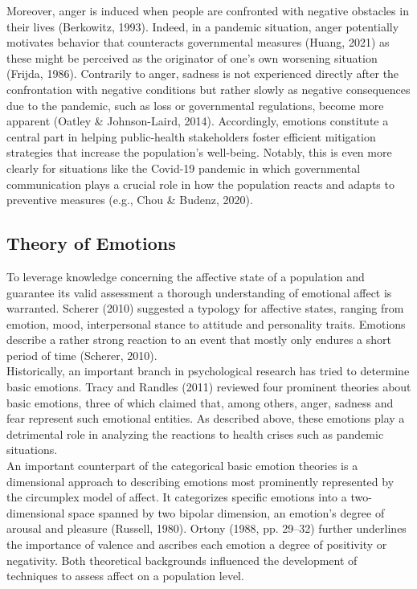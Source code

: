\documentclass[
  english,
  jou,floatsintext]{apa7}
\begin{document}
Moreover, anger is induced when people are confronted with negative obstacles in their lives (Berkowitz, 1993). Indeed, in a pandemic situation, anger potentially motivates behavior that counteracts governmental measures (Huang, 2021) as these might be perceived as the originator of one's own worsening situation (Frijda, 1986). Contrarily to anger, sadness is not experienced directly after the confrontation with negative conditions but rather slowly as negative consequences due to the pandemic, such as loss or governmental regulations, become more apparent (Oatley \& Johnson-Laird, 2014).
Accordingly, emotions constitute a central part in helping public-health stakeholders foster efficient mitigation strategies that increase the population's well-being. Notably, this is even more clearly for situations like the Covid-19 pandemic in which governmental communication plays a crucial role in how the population reacts and adapts to preventive measures (e.g., Chou \& Budenz, 2020).

\hypertarget{theory-of-emotions}{%
\subsection{Theory of Emotions}\label{theory-of-emotions}}

To leverage knowledge concerning the affective state of a population and guarantee its valid assessment a thorough understanding of emotional affect is warranted.
Scherer (2010) suggested a typology for affective states, ranging from emotion, mood, interpersonal stance to attitude and personality traits. Emotions describe a rather strong reaction to an event that mostly only endures a short period of time (Scherer, 2010).\\
\hspace*{0.333em}\hspace*{0.333em} Historically, an important branch in psychological research has tried to determine basic emotions. Tracy and Randles (2011) reviewed four prominent theories about basic emotions, three of which claimed that, among others, anger, sadness and fear represent such emotional entities. As described above, these emotions play a detrimental role in analyzing the reactions to health crises such as pandemic situations.\\
\hspace*{0.333em}\hspace*{0.333em} An important counterpart of the categorical basic emotion theories is a dimensional approach to describing emotions most prominently represented by the circumplex model of affect. It categorizes specific emotions into a two-dimensional space spanned by two bipolar dimension, an emotion's degree of arousal and pleasure (Russell, 1980). Ortony (1988, pp. 29--32) further underlines the importance of valence and ascribes each emotion a degree of positivity or negativity. Both theoretical backgrounds influenced the development of techniques to assess affect on a population level.
\end{document}
